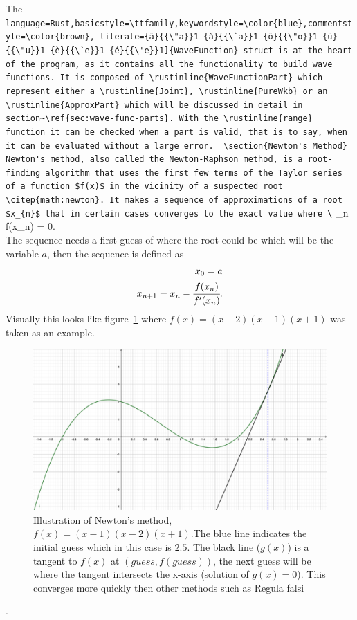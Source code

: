 \documentclass[11pt,DIV=10,final]{scrreprt} %
\providecommand{\rustinline}{\lstinline[language=Rust,basicstyle=\ttfamily,keywordstyle=\color{blue},commentstyle=\color{brown}, literate={ä}{{\"a}}1 {à}{{\`a}}1 {ö}{{\"o}}1 {ü}{{\"u}}1 {è}{{\`e}}1 {é}{{\'e}}1]} % für Inline-C++ Code
\begin{document}
The \rustinline{WaveFunction} struct is at the heart of the program, as it contains all the functionality to build wave functions. It is composed of \rustinline{WaveFunctionPart} which represent either a
\rustinline{Joint}, \rustinline{PureWkb} or an \rustinline{ApproxPart} which will be discussed in detail in section~\ref{sec:wave-func-parts}. With the \rustinline{range} function it can be checked when a
part is valid, that is to say, when it can be evaluated without a large error.

\section{Newton's Method}
Newton's method, also called the Newton-Raphson method, is a root-finding algorithm that uses the first few terms of the Taylor series of a function $f(x)$ in the vicinity of a suspected root
\citep{math:newton}. It makes a sequence of approximations of a root $x_{n}$ that in certain cases converges to the exact value where
\[
  \lim _{n \to \infty}f(x_{n}) = 0.
\]
\\
The sequence needs a first guess of where the root could be which will be the variable $a$, then the sequence is defined as
\begin{align*}
  x_{0}=a \\*
  x_{n+1}=x_{n}-\cfrac{f(x_{n})}{f'(x_{n})}.
\end{align*}
Visually this looks like figure~\ref{fig:newton-ilust} where $f(x) = (x-2)(x-1)(x+1)$ was taken as an example.
\begin{figure}[H]
	\includegraphics[width=\textwidth]{plots/newtons-method.pdf}
	\caption{Illustration of Newton's method, $f(x) = (x-1)(x-2)(x+1)$.The blue line indicates the initial guess which in this case is $2.5$. The black line ($g(x)$) is a tangent to $f(x)$ at
      $(guess, f(guess))$, the next guess will be where the tangent intersects the x-axis (solution of $g(x) = 0$). This converges more quickly then other methods such as Regula falsi}
	\label{fig:newton-ilust}
\end{figure}
.
\end{document}
